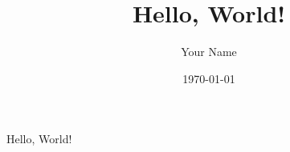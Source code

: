 \documentclass{article}
\begin{document}
\title{Hello, World!}
\author{Your Name}
\date{\today}

\maketitle

Hello, World!
\end{document}
